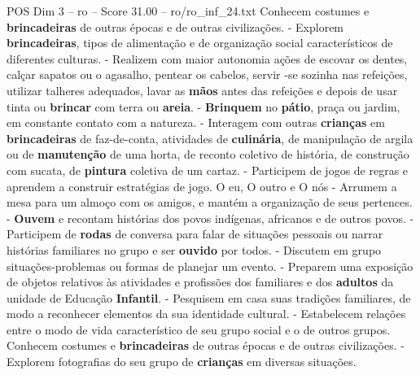 \begin{textsample}{POS Dim 3 – ro – Score 31.00 – ro/ro\_inf\_24.txt}
Conhecem costumes e \textbf{brincadeiras} de outras épocas e de outras civilizações. - Explorem \textbf{brincadeiras}, tipos de alimentação e de organização social característicos de diferentes culturas. - Realizem com maior autonomia ações de escovar os dentes, calçar sapatos ou o agasalho, pentear os cabelos, servir -se sozinha nas refeições, utilizar talheres adequados, lavar as \textbf{mãos} antes das refeições e depois de usar tinta ou \textbf{brincar} com terra ou \textbf{areia}. - \textbf{Brinquem} no \textbf{pátio}, praça ou jardim, em constante contato com a natureza. - Interagem com outras \textbf{crianças} em \textbf{brincadeiras} de faz-de-conta, atividades de \textbf{culinária}, de manipulação de argila ou de \textbf{manutenção} de uma horta, de reconto coletivo de história, de construção com sucata, de \textbf{pintura} coletiva de um cartaz. - Participem de jogos de regras e aprendem a construir estratégias de jogo.
O eu, O outro e O nós - Arrumem a mesa para um almoço com os amigos, e mantém a organização de seus pertences. - \textbf{Ouvem} e recontam histórias dos povos indígenas, africanos e de outros povos. - Participem de \textbf{rodas} de conversa para falar de situações pessoais ou narrar histórias familiares no grupo e ser \textbf{ouvido} por todos. - Discutem em grupo situações-problemas ou formas de planejar um evento. - Preparem uma exposição de objetos relativos às atividades e profissões dos familiares e dos \textbf{adultos} da unidade de Educação \textbf{Infantil}. - Pesquisem em casa suas tradições familiares, de modo a reconhecer elementos da sua identidade cultural. - Estabelecem relações entre o modo de vida característico de seu grupo social e o de outros grupos.
Conhecem costumes e \textbf{brincadeiras} de outras épocas e de outras civilizações. - Explorem fotografias do seu grupo de \textbf{crianças} em diversas situações.

\end{textsample}
